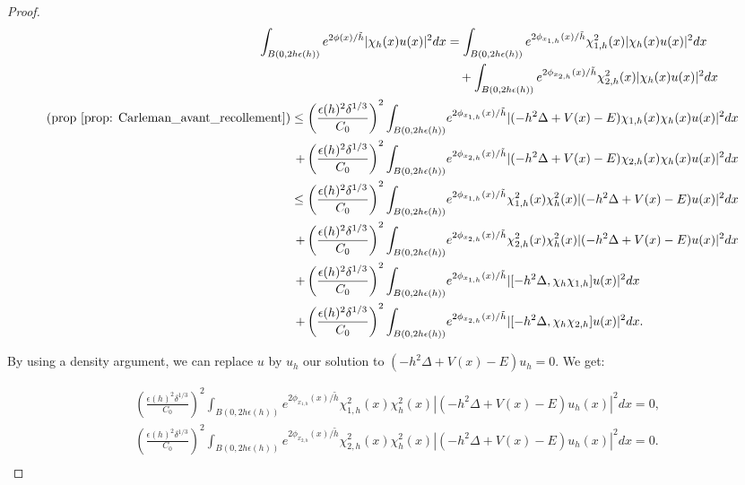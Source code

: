 \documentclass[leqno,11pt,letterpaper, english]{amsart}
\newcommand{\nn}{\nonumber}
\theoremstyle{plain}
\theoremstyle{definition}
\numberwithin{equation}{section}
\begin{document}
\begin{proof}
	\begin{align}
		\int_{B(0,2h\epsilon(h))} e^{2\phi(x)/\tilde{h}} |\chi_{h}(x) u(x)|^2 dx &= \int_{B(0,2h\epsilon(h))} e^{2\phi_{x_{1,h}}(x)/\tilde{h}} \chi_{1,h}^2(x) |\chi_{h}(x) u(x)|^2 dx \nn\\
		&\quad +\int_{B(0,2h\epsilon(h))} e^{2\phi_{x_{2,h}}(x)/\tilde{h}} \chi_{2,h}^2(x) |\chi_{h}(x) u(x)|^2 dx\nn\\
		(\mbox{prop \ref{prop: Carleman_avant_recollement}})\leq \left(\frac{\epsilon(h)^2\delta^{1/3}}{C_0}\right)^2  \int_{B(0,2h\epsilon(h))} & e^{2\phi_{x_{1,h}}(x)/\tilde{h}}  |(-h^2\Delta +V(x)-E)\chi_{1,h}(x) \chi_{h}(x)u(x)|^2 dx   \nn\\
		\quad +\left(\frac{\epsilon(h)^2\delta^{1/3}}{C_0}\right)^2\int_{B(0,2h\epsilon(h))} & e^{2\phi_{x_{2,h}}(x)/\tilde{h}}  |(-h^2\Delta +V(x)-E)\chi_{2,h}(x) \chi_{h}(x)u(x)|^2 dx   \nn\\
		\leq \left(\frac{\epsilon(h)^2\delta^{1/3}}{C_0}\right)^2  \int_{B(0,2h\epsilon(h))} & e^{2\phi_{x_{1,h}}(x)/\tilde{h}} \chi_{1,h}^2(x) \chi_{h}^2(x) |(-h^2\Delta +V(x)-E)u(x)|^2 dx   \nn\\
		\quad +\left(\frac{\epsilon(h)^2\delta^{1/3}}{C_0}\right)^2  \int_{B(0,2h\epsilon(h))} & e^{2\phi_{x_{2,h}}(x)/\tilde{h}} \chi_{2,h}^2(x) \chi_{h}^2(x) |(-h^2\Delta +V(x)-E)u(x)|^2 dx   \nn\\
		\quad +\left(\frac{\epsilon(h)^2\delta^{1/3}}{C_0}\right)^2  \int_{B(0,2h\epsilon(h))} & e^{2\phi_{x_{1,h}}(x)/\tilde{h}}  |[-h^2\Delta, \chi_{h}\chi_{1,h}]u(x)|^2 dx   \nn\\
		\quad +\left(\frac{\epsilon(h)^2\delta^{1/3}}{C_0}\right)^2  \int_{B(0,2h\epsilon(h))} & e^{2\phi_{x_{2,h}}(x)/\tilde{h}}  |[-h^2\Delta, \chi_{h}\chi_{2,h}]u(x)|^2  dx.  \nn\\
	\end{align}
	
	By using a density argument, we can replace $u$ by $u_h$ our solution to $(-h^2\Delta +V(x)-E)u_h=0$. We get:
	
	\begin{align}
	&\left(\frac{\epsilon(h)^2\delta^{1/3}}{C_0}\right)^2  \int_{B(0,2h\epsilon(h))}  e^{2\phi_{x_{1,h}}(x)/\tilde{h}} \chi_{1,h}^2(x) \chi_{h}^2(x) |(-h^2\Delta +V(x)-E)u_h(x)|^2 dx=0,  \nn\\
	&\left(\frac{\epsilon(h)^2\delta^{1/3}}{C_0}\right)^2  \int_{B(0,2h\epsilon(h))}  e^{2\phi_{x_{2,h}}(x)/\tilde{h}} \chi_{2,h}^2(x) \chi_{h}^2(x) |(-h^2\Delta +V(x)-E)u_h(x)|^2 dx=0.   \nn\\
	\end{align}
	

\end{proof}
\end{document}
